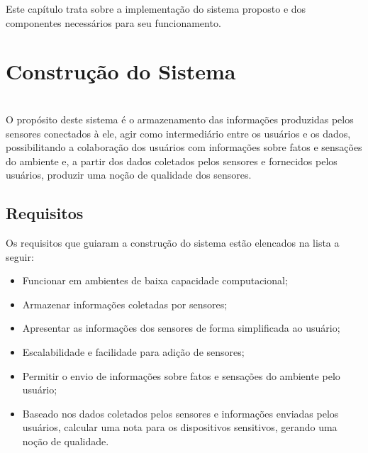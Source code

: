 \newcommand{\texCommand}[1]{\texttt{\textbackslash{#1}}}%

\newcommand{\exemplo}[1]{%
\vspace{\baselineskip}%
\noindent\fbox{\begin{minipage}{\textwidth}#1\end{minipage}}%
\\\vspace{\baselineskip}}%

\newcommand{\exemploVerbatim}[1]{%
\vspace{\baselineskip}%
\noindent\fbox{\begin{minipage}{\textwidth}%
#1\end{minipage}}%
\\\vspace{\baselineskip}}%


\quad Este capítulo trata sobre a implementação do sistema proposto e dos componentes necessários para seu funcionamento.
\section{Construção do Sistema}
\\\null \quad O propósito deste sistema é o armazenamento das informações produzidas pelos sensores conectados à ele, agir como intermediário entre os usuários e os dados, possibilitando a colaboração dos usuários com informações sobre fatos e sensações do ambiente e, a partir dos dados coletados pelos sensores e fornecidos pelos usuários, produzir uma noção de qualidade dos sensores.

\subsection{Requisitos}
Os requisitos que guiaram a construção do sistema estão elencados na lista a seguir:
\begin{itemize}
  \item Funcionar em ambientes de baixa capacidade computacional;
  \item Armazenar informações coletadas por sensores;
  \item Apresentar as informações dos sensores de forma simplificada ao usuário;
  \item Escalabilidade e facilidade para adição de sensores;
  \item Permitir o envio de informações sobre fatos e sensações do ambiente pelo usuário;
  \item Baseado nos dados coletados pelos sensores e informações enviadas pelos usuários, calcular uma nota para os dispositivos sensitivos, gerando uma noção de qualidade.
\end{itemize}

